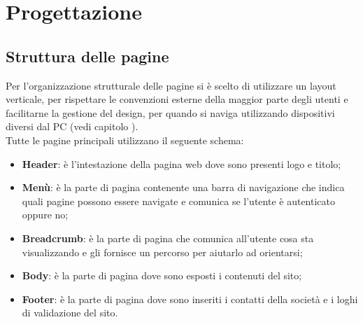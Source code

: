 \section{Progettazione}
    \subsection{Struttura delle pagine}
    Per l'organizzazione strutturale delle pagine si è scelto di utilizzare un layout verticale, per rispettare le convenzioni esterne della maggior parte degli utenti e facilitarne la gestione del design, per quando si naviga utilizzando dispositivi diversi dal PC (vedi capitolo ).\\
    Tutte le pagine principali utilizzano il seguente schema:
    \begin{itemize}
        \item \textbf{Header}: è l'intestazione della pagina web dove sono presenti logo e titolo;
        \item \textbf{Menù}: è la parte di pagina contenente una barra di navigazione che indica quali pagine possono essere navigate e comunica se l'utente è autenticato oppure no;
        \item \textbf{Breadcrumb}: è la parte di pagina che comunica all'utente cosa sta visualizzando e gli fornisce un percorso per aiutarlo ad orientarsi;
        \item \textbf{Body}: è la parte di pagina dove sono esposti i contenuti del sito;
        \item \textbf{Footer}: è la parte di pagina dove sono inseriti i contatti della società e i loghi di validazione del sito.
    \end{itemize}
    
